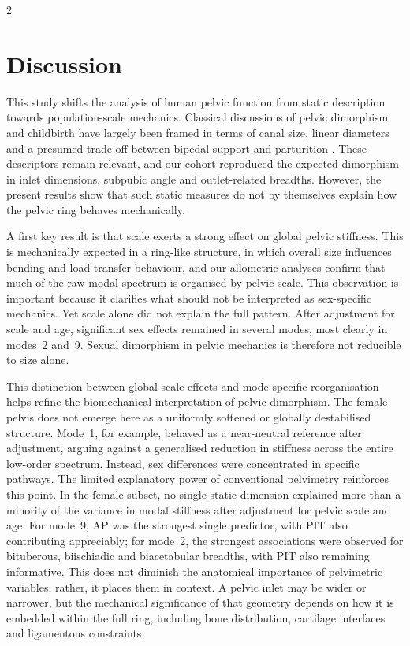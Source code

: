 \documentclass[openacc]{rsproca_new}
\begin{document}
\begin{multicols}{2}
\section{Discussion}

This study shifts the analysis of human pelvic function from static description towards population-scale mechanics. Classical discussions of pelvic dimorphism and childbirth have largely been framed in terms of canal size, linear diameters and a presumed trade-off between bipedal support and parturition \cite{RosenbergTrevathan2002,Trevathan2015,Grunstra2023}. These descriptors remain relevant, and our cohort reproduced the expected dimorphism in inlet dimensions, subpubic angle and outlet-related breadths. However, the present results show that such static measures do not by themselves explain how the pelvic ring behaves mechanically.

A first key result is that scale exerts a strong effect on global pelvic stiffness. This is mechanically expected in a ring-like structure, in which overall size influences bending and load-transfer behaviour, and our allometric analyses confirm that much of the raw modal spectrum is organised by pelvic scale. This observation is important because it clarifies what should not be interpreted as sex-specific mechanics. Yet scale alone did not explain the full pattern. After adjustment for scale and age, significant sex effects remained in several modes, most clearly in modes~2 and~9. Sexual dimorphism in pelvic mechanics is therefore not reducible to size alone.

This distinction between global scale effects and mode-specific reorganisation helps refine the biomechanical interpretation of pelvic dimorphism. The female pelvis does not emerge here as a uniformly softened or globally destabilised structure. Mode~1, for example, behaved as a near-neutral reference after adjustment, arguing against a generalised reduction in stiffness across the entire low-order spectrum. Instead, sex differences were concentrated in specific pathways. 
The limited explanatory power of conventional pelvimetry reinforces this point. In the female subset, no single static dimension explained more than a minority of the variance in modal stiffness after adjustment for pelvic scale and age. For mode~9, AP was the strongest single predictor, with PIT also contributing appreciably; for mode~2, the strongest associations were observed for bituberous, biischiadic and biacetabular breadths, with PIT also remaining informative. This does not diminish the anatomical importance of pelvimetric variables; rather, it places them in context. A pelvic inlet may be wider or narrower, but the mechanical significance of that geometry depends on how it is embedded within the full ring, including bone distribution, cartilage interfaces and ligamentous constraints.


\end{multicols}
\end{document}
